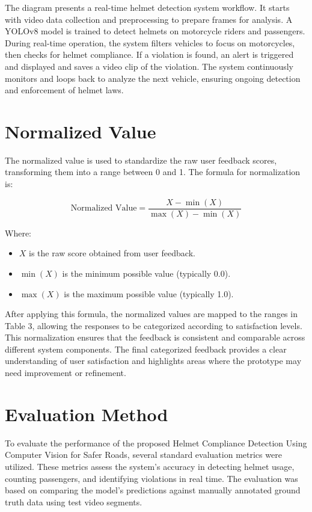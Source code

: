 \begin{refsection}
\noindent
The diagram presents a real-time helmet detection system workflow. It starts with video data collection and preprocessing to prepare frames for analysis. A YOLOv8 model is trained to detect helmets on motorcycle riders and passengers. 
During real-time operation, the system filters vehicles to focus on motorcycles, then checks for helmet compliance. If a violation is found, an alert is triggered and displayed and saves a video clip of the violation. The system continuously monitors and loops back to analyze the next vehicle, ensuring ongoing detection and enforcement of helmet laws.

\section*{Normalized Value}
The normalized value is used to standardize the raw user feedback scores, transforming them into a range between 0 and 1. The formula for normalization is:


\begin{equation}
\text{Normalized Value} = \frac{X - \min(X)}{\max(X) - \min(X)}
\end{equation}


\noindent Where:  
\begin{itemize}
    \item $X$ is the raw score obtained from user feedback.
    \item $\min(X)$ is the minimum possible value (typically 0.0).
    \item $\max(X)$ is the maximum possible value (typically 1.0).
\end{itemize}


After applying this formula, the normalized values are mapped to the ranges in Table 3, allowing the responses to be categorized according to satisfaction levels. This normalization ensures that the feedback is consistent and comparable across different system components. The final categorized feedback provides a clear understanding of user satisfaction and highlights areas where the prototype may need improvement or refinement.


\section*{Evaluation Method}
To evaluate the performance of the proposed Helmet Compliance Detection Using Computer Vision for Safer Roads, several standard evaluation metrics were utilized. These metrics assess the system’s accuracy in detecting helmet usage, counting passengers, and identifying violations in real time. The evaluation was based on comparing the model’s predictions against manually annotated ground truth data using test video segments.



\end{refsection}
